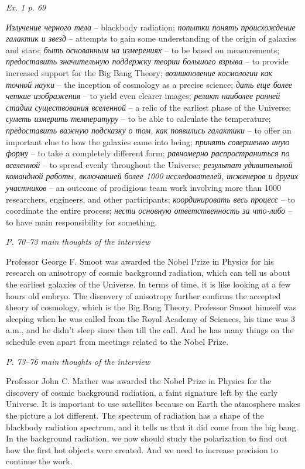 \documentclass[a4paper, 12pt]{article}
\def\task#1{\begin{center}\it #1\end{center}}
\begin{document}
\task{Ex. 1 p. 69}
\textit{Излучение черного тела} -- blackbody radiation;
\textit{попытки понять происхождение галактик и звезд} -- attempts to gain some understanding of the origin of galaxies and stars;
\textit{быть основанным на измерениях} -- to be based on measurements;
\textit{предоставить значительную поддержку теории большого взрыва} -- to provide increased support for the Big Bang Theory;
\textit{возникновение космологии как точной науки} -- the inception of cosmology as a precise science;
\textit{дать еще более четкие изображения} -- to yield even clearer images;
\textit{реликт наиболее ранней стадии существования вселенной} -- a relic of the earliest phase of the Universe;
\textit{суметь измерить температуру} -- to be able to calculate the temperature;
\textit{предоставить важную подсказку о том, как появились галактики} -- to offer an important clue to how the galaxies came into being;
\textit{принять совершенно иную форму} -- to take a completely different form;
\textit{равномерно распространиться по вселенной} -- to spread evenly throughout the Universe;
\textit{результат удивительной командной работы, включавшей более 1000 исследователей, инженеров и других участников} -- an outcome of prodigious team work involving more than 1000 researchers, engineers, and other participants;
\textit{координировать весь процесс} -- to coordinate the entire process;
\textit{нести основную ответственность за что-либо} -- to have main responsibility for something.

\task{P. 70--73 main thoughts of the interview}
Professor George F. Smoot was awarded the Nobel Prize in Physics for his 
research on anisotropy of cosmic background radiation, which can tell us about 
the earliest galaxies of the Universe. In terms of time, it is like looking at 
a few hours old embryo. The discovery of anisotropy further confirms the 
accepted theory of cosmology, which is the Big Bang Theory. Professor Smoot 
himself was sleeping when he was called from the Royal Academy of Sciences, his 
time was 3 a.m., and he didn't sleep since then till the call. And he has many 
things on the schedule even apart from meetings related to the Nobel Prize.

\task{P. 73--76 main thoughts of the interview}
Professor John C. Mather was awarded the Nobel Prize in Physics for the 
discovery of cosmic background radiation, a faint signature left by the early 
Universe. It is important to use satellites because on Earth the atmosphere 
makes the picture a lot different. The spectrum of radiation has a shape of the 
blackbody radiation spectrum, and it tells us that it did come from the big 
bang. In the background radiation, we now should study the polarization to find 
out how the first hot objects were created. And we need to increase precision 
to continue the work.
\end{document}
